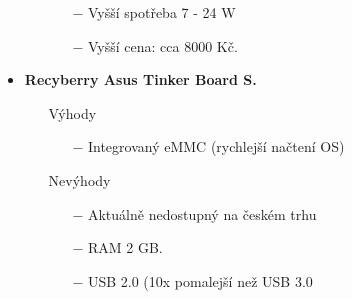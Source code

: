 \begin{itemize}
\begin{itemize}
\begin{itemize}
                \item[$-$] Vyšší spotřeba 7 - 24 W
                \item[$-$] Vyšší cena: cca 8000 Kč.
            \end{itemize}
        \end{itemize}
    \item \textbf{Recyberry Asus Tinker Board S.} 
        \begin{itemize}
            \item[] Výhody
            \begin{itemize}
                \item[$-$] Integrovaný eMMC (rychlejší načtení OS)
            \end{itemize}
            \item[] Nevýhody
            \begin{itemize}
                \item[$-$] Aktuálně nedostupný na českém trhu%
                \item[$-$] RAM 2 GB.
                \item[$-$] USB 2.0 (10x pomalejší než USB 3.0 
            \end{itemize}
        \end{itemize}
\end{itemize}











%
%
%
%
